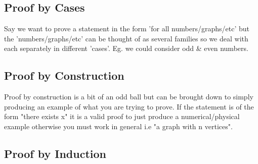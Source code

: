 \documentclass[12pt] {article}
\begin{document}
\subsection*{Proof by Cases}
Say we want to prove a statement in the form 'for all numbers/graphs/etc' but 
the 'numbers/graphs/etc' can be thought of as several families so we deal with each 
separately in different 'cases'. Eg. we could consider odd \& even numbers.
\subsection*{Proof by Construction}
Proof by construction is a bit of an odd ball but can be brought down to simply 
producing an example of what you are trying to prove. If the statement is 
of the form "there exists x" it is a valid proof to just produce a numerical/physical
example otherwise you must work in general i.e "a graph with n vertices".
\subsection*{Proof by Induction}
\end{document}
